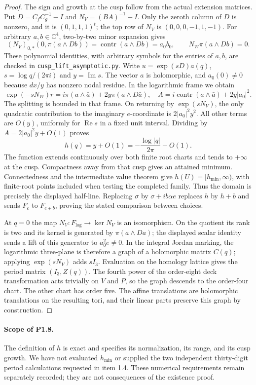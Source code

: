\begin{proof}
The sign and growth at the cusp follow from the actual extension
matrices.  Put $D=C_fC_g^{-1}-I$ and $N_V=(BA)^{-1}-I$.
Only the zeroth column of $D$ is nonzero, and it is $(0,1,1,1)^t$;
the top row of $N_V$ is $(0,0,0,-1,1,-1)$.
For arbitrary $a,b\in\mathbb C^4$, two-by-two minor expansion gives
\[
(N_V)_{0,*}(0,\pi(a\wedge Db))
 =\operatorname{contr}(a\wedge Db)=a_0b_0,
 \qquad N_W\pi(a\wedge Db)=0.
\]
These polynomial identities, with arbitrary symbols for the entries of
$a,b$, are checked in \texttt{cusp\_lift\_asymptotic.py}.
Write $u=\exp(sD)a(q)$, $s=\log q/(2\pi i)$ and $y=\operatorname{Im}s$.
The vector $a$ is holomorphic, and $a_0(0)\ne0$ because $dx/y$ has
nonzero nodal residue.  In the logarithmic frame we obtain
\[
\exp(-sN_W)r=i\pi(a\wedge\bar a)+2y\pi(a\wedge D\bar a),
\quad
A=i\operatorname{contr}(a\wedge\bar a)+2y|a_0|^2.
\]
The splitting is bounded in that frame.  On returning by
$\exp(sN_V)$, the only quadratic contribution to the imaginary
$e$-coordinate is $2|a_0|^2y^2$.  All other terms are $O(y)$,
uniformly for $\operatorname{Re}s$ in a fixed unit interval.
Dividing by $A=2|a_0|^2y+O(1)$ proves
\[
h(q)=y+O(1)=-\frac{\log|q|}{2\pi}+O(1).
\]
The function extends continuously over both finite root charts and
tends to $+\infty$ at the cusp.  Compactness away from that cusp gives
an attained minimum.  Connectedness and the intermediate value
theorem give $h(U)=[h_{\min},\infty)$, with finite-root points included
when testing the completed family.  Thus the domain is precisely the
displayed half-line.  Replacing $\sigma$ by $\sigma+ib\alpha e$ replaces
$h$ by $h+b$ and sends $F_c$ to $F_{c+b}$, proving the stated
comparison between choices.

At $q=0$ the map $N_V:F_{\log}\to\ker N_V$ is an isomorphism.
On the quotient its rank is two and its kernel is generated by
$\pi(a\wedge Da)$; the displayed scalar identity sends a lift of this
generator to $a_0^2e\ne0$.  In the integral Jordan marking, the
logarithmic three-plane is therefore a graph of a holomorphic matrix
$C(q)$; applying $\exp(sN_V)$ adds $sI_3$.  Evaluation on the homology
lattice gives the period matrix $(I_3,Z(q))$.
The fourth power of the order-eight deck transformation acts trivially
on $V$ and $P$, so the graph descends to the order-four chart.
The other chart has order five.  The affine translations are
holomorphic translations on the resulting tori, and their linear
parts preserve this graph by construction.
\end{proof}

\paragraph{Scope of P1.8.}
The definition of $h$ is exact and specifies its normalization, its
range, and its cusp growth.  We have not evaluated $h_{\min}$ or
supplied the two independent thirty-digit period calculations requested
in item 1.4.  These numerical requirements remain separately recorded;
they are not consequences of the existence proof.

